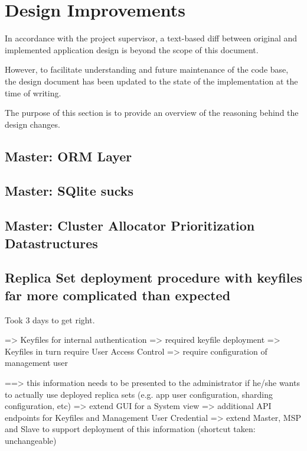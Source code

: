 \section{Design Improvements}

In accordance with the project supervisor, a text-based diff between original and implemented application design
is beyond the scope of this document.

However, to facilitate understanding and future maintenance of the code base, the design document has been updated to the state of
the implementation at the time of writing.

The purpose of this section is to provide an overview of the reasoning behind the design changes.


\subsection{Master: ORM Layer}

\subsection{Master: SQlite sucks}

\subsection{Master: Cluster Allocator Prioritization Datastructures}

\subsection{Replica Set deployment procedure with keyfiles far more complicated than expected}

Took 3 days to get right.

=> Keyfiles for internal authentication => required keyfile deployment
=> Keyfiles in turn require User Access Control  => require configuration of management user

==> this information needs to be presented to the administrator if he/she wants to actually use deployed replica sets
    (e.g. app user configuration, sharding configuration, etc)
    => extend GUI for a System view
      => additional API endpoints for Keyfiles and Management User Credential
    => extend Master, MSP and Slave to support deployment of this information
       (shortcut taken: unchangeable)

